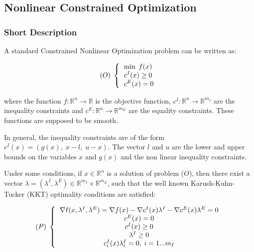\subsection{Nonlinear Constrained Optimization}
\subsubsection{Short Description}

A standard Constrained Nonlinear Optimization problem can be written as:

\begin{equation*}
  (O)\;
  \left\{
    \begin{tabular}{l}
      $\displaystyle   \min \; f(x)$ \\
      $\displaystyle c^I(x) \geq 0$ \\
      $\displaystyle c^E(x) = 0$
    \end{tabular}
  \right.
\end{equation*}

where the function $f : \mathbb{R}^n \rightarrow  \mathbb{R}$ is the objective function, $c^I : \mathbb{R}^n \rightarrow  \mathbb{R}^{m_I} $ are the inequality constraints and $c^E : \mathbb{R}^n \rightarrow  \mathbb{R}^{m_E} $ are the equality constraints. These functions are supposed to be smooth.

In general, the inequality constraints are of the form $c^I(x) = \left (g(x), \; x-l, \; u-x \right )$. The vector $l$ and $u$ are the lower and upper bounds on the variables $x$ and $g(x)$ and the non linear inequality constraints.

Under some conditions, if $x \in \mathbb{R}^n$ is a solution of problem ($O$), then there exist a vector $\lambda=(\lambda^I,\lambda^E) \in \mathbb{R}^{m_I} \times \mathbb{R}^{m_E}$, such that the well known Karush-Kuhn-Tucker (KKT) optimality conditions are satisfied:

\begin{equation*}
  (P)\;
  \left\{
    \begin{tabular}{c}
      $\nabla \ell(x,\lambda^I, \lambda^E) = \nabla f(x) - \nabla c^I(x) \lambda^I - \nabla c^E(x) \lambda^E= 0$ \\
      $c^E(x) = 0 $ \\
      $c^I(x) \geq 0 $ \\
      $\lambda^I \geq 0 $\\
      $c^I_i(x) \lambda^I_i =0, \; i=1...m_I$ \\
    \end{tabular}
  \right.
\end{equation*}

